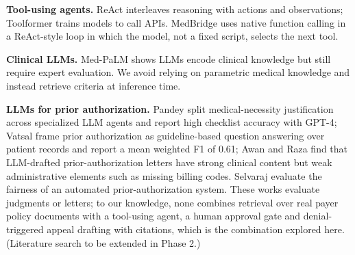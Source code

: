 \documentclass[final]{cvpr}
\begin{document}
\textbf{Tool-using agents.} ReAct \cite{yao2023react} interleaves reasoning with actions and observations; Toolformer \cite{schick2023toolformer} trains models to call APIs. MedBridge uses native function calling in a ReAct-style loop in which the model, not a fixed script, selects the next tool.

\textbf{Clinical LLMs.} Med-PaLM \cite{singhal2022medpalm} shows LLMs encode clinical knowledge but still require expert evaluation. We avoid relying on parametric medical knowledge and instead retrieve criteria at inference time.

\textbf{LLMs for prior authorization.} Pandey \etal\cite{pandey2024multiagent} split medical-necessity justification across specialized LLM agents and report high checklist accuracy with GPT-4; Vatsal \etal\cite{vatsal2024gpt} frame prior authorization as guideline-based question answering over patient records and report a mean weighted F1 of 0.61; Awan and Raza \cite{awan2026pa} find that LLM-drafted prior-authorization letters have strong clinical content but weak administrative elements such as missing billing codes. Selvaraj \etal\cite{selvaraj2026fairness} evaluate the fairness of an automated prior-authorization system. These works evaluate judgments or letters; to our knowledge, none combines retrieval over real payer policy documents with a tool-using agent, a human approval gate and denial-triggered appeal drafting with citations, which is the combination explored here. (Literature search to be extended in Phase 2.)

\end{document}
